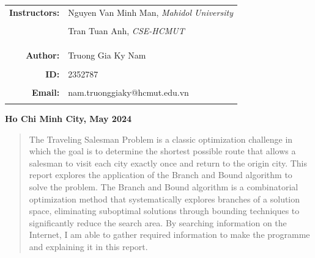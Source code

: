 \documentclass[a4paper]{article}
\begin{document}
\begin{titlepage}
\begin{center}
\begin{tabular}{ccc}
    \multicolumn{1}{r}{\textbf{\Large Instructors:}} & \multicolumn{2}{l}{\Large Nguyen Van Minh Man, \textit{Mahidol University}} \\ \\
    \multicolumn{1}{r}{} & \multicolumn{2}{l}{\Large Tran Tuan Anh, \textit{CSE-HCMUT}} \\ \\

    \\ \\

    \multicolumn{1}{r}{\Large \textbf{Author:}} & \multicolumn{2}{l}{\Large Truong Gia Ky Nam} \\ \\

    \multicolumn{1}{r}{\Large \textbf{ID:}} & \multicolumn{2}{l}{\Large 2352787} \\ \\

    \multicolumn{1}{r}{\Large \textbf{Email:}} & \multicolumn{2}{l}{\Large nam.truonggiaky@hcmut.edu.vn} \\ \\
\end{tabular}
\end{center}

\vspace{4cm}

\begin{center}
{\textbf{\Large Ho Chi Minh City, May 2024}}
\end{center}
\end{titlepage}

\thispagestyle{empty}
\setcounter{page}{-1}
\newpage
\begin{abstract}
    \noindent The Traveling Salesman Problem is a classic optimization challenge in which the goal is to determine the shortest possible route that allows a salesman to visit each city exactly once and return to the origin city. This report explores the application of the Branch and Bound algorithm to solve the problem. The Branch and Bound algorithm is a combinatorial optimization method that systematically explores branches of a solution space, eliminating suboptimal solutions through bounding techniques to significantly reduce the search area. By searching information on the Internet, I am able to gather required information to make the programme and explaining it in this report.
\end{abstract}
\newpage

\setcounter{page}{0}
\thispagestyle{empty}
\newpage
\tableofcontents
\newpage
\end{document}
